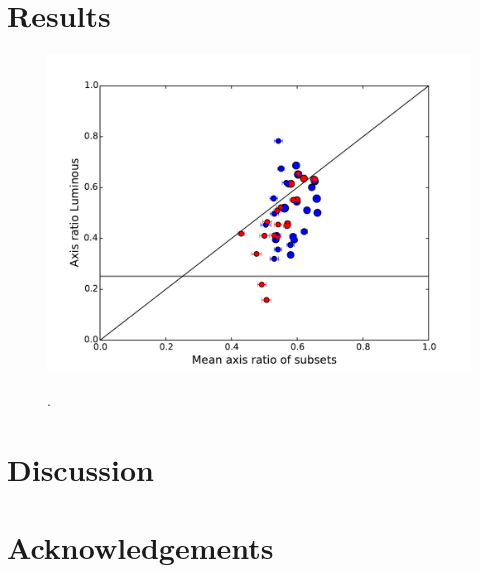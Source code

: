 \documentclass[useAMS,usenatbib]{mn2e}
\begin{document}
\section{Results}
\label{Results}
\begin{figure}
\centering
\includegraphics[width=\hsize]{AxisRatio_RandomMean_VS_Luminous.pdf}\\
\caption{.}
\label{fig:StreamPlaneOrbit}
\end{figure}


\section{Discussion} 
\section{Acknowledgements}





\label{lastpage}
\end{document}
